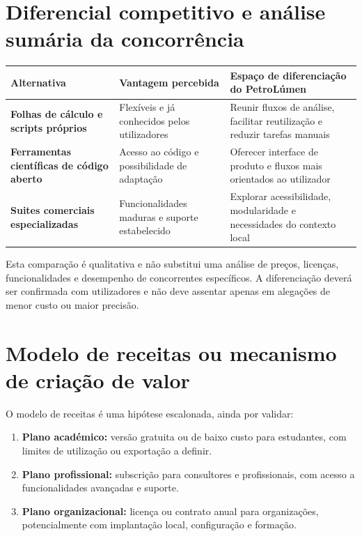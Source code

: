 \documentclass[11pt,a4paper]{article}
\begin{document}
\section{Diferencial competitivo e análise sumária da concorrência}

\begin{tabularx}{\textwidth}{>{\bfseries}p{3.2cm} X X}
  \toprule
  Alternativa & Vantagem percebida & Espaço de diferenciação do PetroLúmen \\
  \midrule
  Folhas de cálculo e scripts próprios
    & Flexíveis e já conhecidos pelos utilizadores
    & Reunir fluxos de análise, facilitar reutilização e reduzir tarefas manuais \\
  Ferramentas científicas de código aberto
    & Acesso ao código e possibilidade de adaptação
    & Oferecer interface de produto e fluxos mais orientados ao utilizador \\
  Suites comerciais especializadas
    & Funcionalidades maduras e suporte estabelecido
    & Explorar acessibilidade, modularidade e necessidades do contexto local \\
  \bottomrule
\end{tabularx}

Esta comparação é qualitativa e não substitui uma análise de preços, licenças,
funcionalidades e desempenho de concorrentes específicos. A diferenciação deverá ser
confirmada com utilizadores e não deve assentar apenas em alegações de menor custo ou
maior precisão.

\section{Modelo de receitas ou mecanismo de criação de valor}

O modelo de receitas é uma hipótese escalonada, ainda por validar:

\begin{enumerate}
  \item \textbf{Plano académico:} versão gratuita ou de baixo custo para estudantes,
  com limites de utilização ou exportação a definir.
  \item \textbf{Plano profissional:} subscrição para consultores e profissionais,
  com acesso a funcionalidades avançadas e suporte.
  \item \textbf{Plano organizacional:} licença ou contrato anual para organizações,
  potencialmente com implantação local, configuração e formação.
\end{enumerate}
\end{document}
